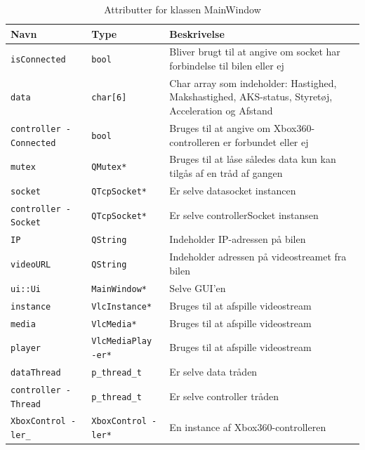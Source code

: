 \begin{table}[H]
\begin{tabularx}{\textwidth}{| Z | Z | L{10cm} |} \hline
Navn & Type & Beskrivelse \\\hline
\texttt{isConnected}         & \texttt{bool}           &Bliver brugt til at angive om socket har forbindelse til bilen eller ej \\\hline
\texttt{data}                & \texttt{char[6]}        &Char array som indeholder: Hastighed, Makshastighed, AKS-status, Styretøj, Acceleration og Afstand\\\hline
\texttt{controller -Connected} & \texttt{bool}           &Bruges til at angive om Xbox360-controlleren er forbundet eller ej\\\hline
\texttt{mutex}               & \texttt{QMutex*}        &Bruges til at låse således data kun kan tilgås af en tråd af gangen\\\hline
\texttt{socket}              & \texttt{QTcpSocket*}    &Er selve datasocket instancen\\\hline
\texttt{controller -Socket}    & \texttt{QTcpSocket*}    &Er selve controllerSocket instansen\\\hline
\texttt{IP}                  & \texttt{QString}        &Indeholder IP-adressen på bilen\\\hline
\texttt{videoURL}            & \texttt{QString}        &Indeholder adressen på videostreamet fra bilen\\\hline
\texttt{ui::Ui}              & \texttt{MainWindow*}    &Selve GUI'en\\\hline
\texttt{instance}            & \texttt{VlcInstance*}   &Bruges til at afspille videostream\\\hline
\texttt{media}               & \texttt{VlcMedia*}      &Bruges til at afspille videostream\\\hline
\texttt{player}              & \texttt{VlcMediaPlay -er*}&Bruges til at afspille videostream\\\hline
\texttt{dataThread}          & \texttt{p\_thread\_t}     &Er selve data tråden\\\hline
\texttt{controller -Thread}    & \texttt{p\_thread\_t}     &Er selve controller tråden\\\hline
\texttt{XboxControl -ler\_}     & \texttt{XboxControl -ler*}&En instance af Xbox360-controlleren\\\hline

\end{tabularx}
\caption{Attributter for klassen MainWindow}
\label{table:attr_distancesensor}
\end{table}

